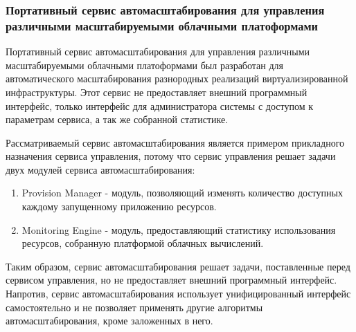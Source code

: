 \subsubsection{Портативный сервис автомасштабирования для управления различными масштабируемыми облачными платоформами}
Портативный сервис автомасштабирования для управления различными масштабируемыми облачными платоформами\cite{portable-autoscaler-for-managing-multi-cloud-elasticity} был разработан для автоматического масштабирования разнородных реализаций виртуализированной инфраструктуры.
Этот сервис не предоставляет внешний программный интерфейс, только интерфейс для администратора системы с доступом к параметрам сервиса, а так же собранной статистике.

Рассматриваемый сервис автомасштабирования является примером прикладного назначения сервиса управления, потому что сервис управления решает задачи двух модулей сервиса автомасштабирования:
\begin{enumerate}
    \item Provision Manager - модуль, позволяющий изменять количество доступных каждому запущенному приложению ресурсов.
    \item Monitoring Engine - модуль, предоставляющий статистику использования ресурсов, собранную платформой облачных вычислений.
\end{enumerate}

Таким образом, сервис автомасштабирования решает задачи, поставленные перед сервисом управления, но не предоставляет внешний программный интерфейс.
Напротив, сервис автомасштабирования использует унифицированный интерфейс самостоятельно и не позволяет применять другие алгоритмы автомасштабирования, кроме заложенных в него.